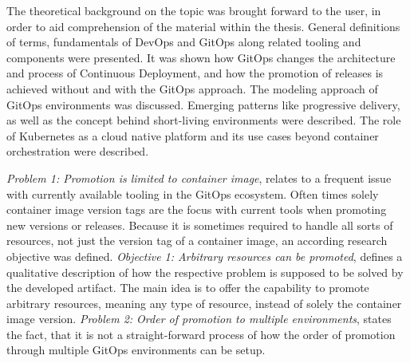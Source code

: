 The theoretical background on the topic was brought forward to the user,
in order to aid comprehension of the material within the thesis.
General definitions of terms,
fundamentals of DevOps and GitOps along related tooling and components were presented.
It was shown how GitOps changes the architecture and process of Continuous Deployment,
and how the promotion of releases is achieved without and with the GitOps approach.
The modeling approach of GitOps environments was discussed.
Emerging patterns like progressive delivery,
as well as the concept behind short-living environments were described.
The role of Kubernetes as a cloud native platform and its use cases beyond container orchestration were described.

\textit{Problem 1: Promotion is limited to container image},
relates to a frequent issue with currently available tooling in the GitOps ecosystem. 
Often times solely container image version tags are the focus with current tools when promoting
new versions or releases.
Because it is sometimes required to handle all sorts of resources, not just the version tag of a container image,
an according research objective was defined.
\textit{Objective 1: Arbitrary resources can be promoted},
defines a qualitative description of how the respective problem is supposed to be solved
by the developed artifact. The main idea is to offer the capability to promote arbitrary resources,
meaning any type of resource, instead of solely the container image version.
%
\textit{Problem 2: Order of promotion to multiple environments},
states the fact, that it is not a straight-forward process of how the order of promotion
through multiple GitOps environments can be setup.
